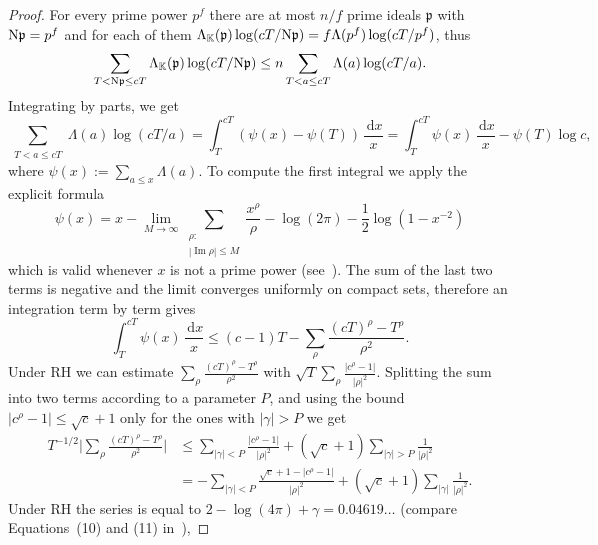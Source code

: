 \documentclass[a4paper,11pt]{amsart}
\newcommand{\field}[1]{\mathbb{{#1}}}
\newcommand{\ideal}[1]{\mathfrak{{#1}}}
\newcommand{\K}{\field{{K}}}
\newcommand{\p}{\ideal{p}}
\newcommand{\Norm}{\textrm{\upshape N}}
\newcommand{\dd}{\,\mathrm{d}}
\DeclareMathOperator{\Imm}{Im}
\theoremstyle{remark}
\begin{document}
\begin{proof}
For every prime power $p^f$ there are at most $n/f$ prime ideals $\p$ with $\Norm\p = p^f$
%
and for each of them $\Lambda_{\K}(\p)\log(cT/\Norm\p) = f\Lambda(p^f)\log(cT/p^f)$, thus
\[
\sum_{\substack{T< \Norm\p \leq cT}} \Lambda_{\K}(\p)\log(cT/\Norm\p)
\leq n\sum_{T<a\leq cT} \Lambda(a)\log(cT/a).
\]
Integrating by parts, we get
\[
\sum_{\substack{T< a \leq cT}} \Lambda(a)\log(cT/a)
= \int_T^{cT}(\psi(x)-\psi(T))\,\frac{\!\dd x}{x}
= \int_T^{cT}\psi(x)\,\frac{\!\dd x}{x} - \psi(T)\log c,
\]
where $\psi(x) := \sum_{a\leq x}\Lambda(a)$.
To compute the first integral we apply the explicit formula
\[
\psi(x)
= x
  - \lim_{M\to\infty}\sum_{\substack{\rho:\\ |\Imm \rho|\leq M}} \frac{x^\rho}{\rho}
  - \log(2\pi)
  - \frac{1}{2}\log(1-x^{-2})
\]
which is valid whenever $x$ is not a prime power (see~\cite[Ch.~17]{Davenport}). The sum of the last two
terms is negative and the limit converges uniformly on compact sets, therefore an integration term by
term gives
\[
\int_T^{cT}\psi(x)\,\frac{\!\dd x}{x}
\leq
(c-1)T - \sum_{\rho} \frac{(cT)^{\rho}-T^{\rho}}{\rho^2}.
\]
Under RH we can estimate $\sum_{\rho} \frac{(cT)^{\rho}-T^{\rho}}{\rho^2}$ with $\sqrt{T}\sum_{\rho}
\frac{|c^\rho-1|}{|\rho|^2}$. Splitting the sum into two terms according to a parameter $P$, and using
the bound $|c^\rho-1|\leq \sqrt{c}+1$ only for the ones with $|\gamma|>P$ we get
%
\begin{align*}
T^{-1/2}\Big|\sum_{\rho} \frac{(cT)^\rho-T^\rho}{\rho^2}\Big|
&\leq \sum_{|\gamma|<P} \frac{|c^\rho-1|}{|\rho|^2} + (\sqrt{c}+1)\sum_{|\gamma|>P} \frac{1}{|\rho|^2}                                          \\
&=   -\sum_{|\gamma|<P} \frac{\sqrt{c}+1-|c^\rho-1|}{|\rho|^2} + (\sqrt{c}+1)\sum_{|\gamma|} \frac{1}{|\rho|^2}.
\end{align*}
%
Under RH the series is equal to $2 - \log(4\pi) + \gamma = 0.04619\ldots$ (compare Equations~(10) and
(11) in~\cite[Ch.~12]{Davenport}),
%

\end{proof}
\end{document}
